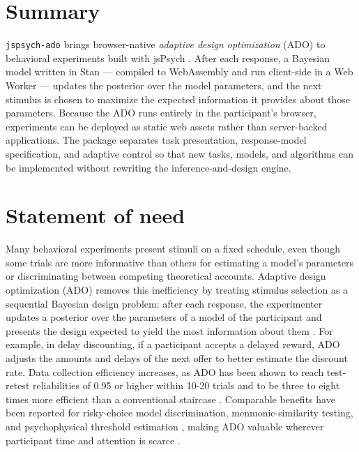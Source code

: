 
\section{Summary}

\texttt{jspsych-ado} brings browser-native \emph{adaptive design optimization} (ADO) to behavioral experiments built with jsPsych \citep{deleeuw2015jspsych}. 
After each response, a Bayesian model written in Stan \citep{carpenter2017stan} --- compiled to WebAssembly and run client-side in a Web Worker --- updates the posterior over the model parameters, and the next stimulus is chosen to maximize the expected information it provides about those parameters. 
Because the ADO runs entirely in the participant's browser, experiments can be deployed as static web assets rather than server-backed applications.
The package separates task presentation, response-model specification, and adaptive control so that new tasks, models, and algorithms can be implemented without rewriting the inference-and-design engine.

\section{Statement of need}

Many behavioral experiments present stimuli on a fixed schedule, even though some trials are more informative than others for estimating a model's parameters or discriminating between competing theoretical accounts. 
Adaptive design optimization (ADO) removes this inefficiency by treating stimulus selection as a sequential Bayesian design problem: after each response, the experimenter updates a posterior over the parameters of a model of the participant and presents the design expected to yield the most information about them \citep{cavagnaro2010adaptive,myung2013tutorial}.
For example, in delay discounting, if a participant accepts a delayed reward, ADO adjusts the amounts and delays of the next offer to better estimate the discount rate. 
Data collection efficiency increases, as ADO has been shown to reach test-retest reliabilities of 0.95 or higher within 10-20 trials and to be three to eight times more efficient than a conventional staircase \citep{ahn2020rapid}.
Comparable benefits have been reported for risky-choice model discrimination, menmonic-similarity testing, and psychophysical threshold estimation \citep{cavagnaro2012optimal,watson2017questplus}, making ADO valuable wherever participant time and attention is scarce \citep{ahn2020rapid,cavagnaro2012optimal,villarreal2022adaptive}.

